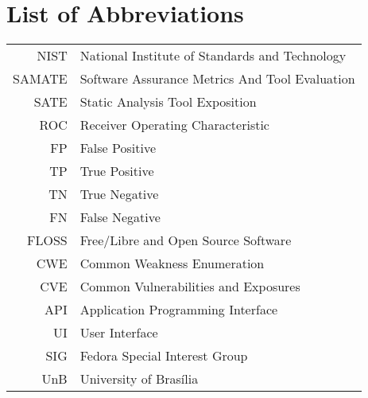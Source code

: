 \chapter*{List of Abbreviations}
\begin{tabular}{rl}
  NIST & National Institute of Standards and Technology \\
  SAMATE & Software Assurance Metrics And Tool Evaluation \\
  SATE & Static Analysis Tool Exposition \\
  ROC & Receiver Operating Characteristic \\
  FP & False Positive \\
  TP & True Positive \\
  TN & True Negative \\
  FN & False Negative \\
  FLOSS & Free/Libre and Open Source Software \\
  CWE & Common Weakness Enumeration \\
  CVE & Common Vulnerabilities and Exposures \\
  API & Application Programming Interface \\
  UI & User Interface \\
  SIG & Fedora Special Interest Group \\
  UnB & University of Brasília

\end{tabular}



\listoffigures

\listoftables

